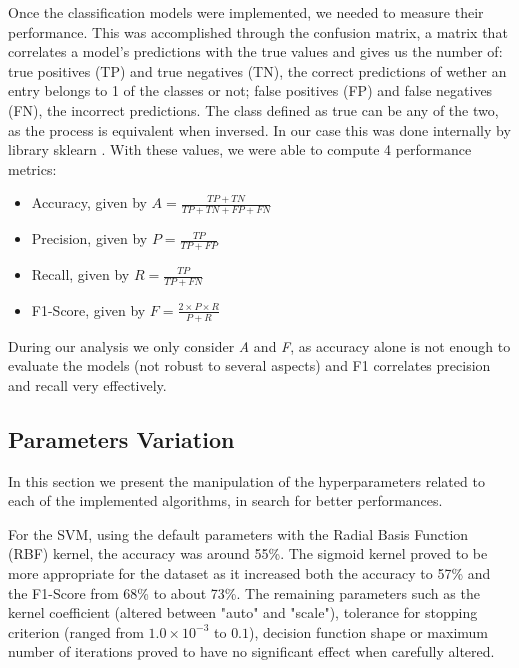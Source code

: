 \documentclass[extendedabs]{recpad2k}
\begin{document}
Once the classification models were implemented, we needed to measure their performance.
This was accomplished through the confusion matrix, a matrix that correlates a model's predictions with the true values and gives us the number of: 
true positives (TP) and true negatives (TN), the correct predictions of wether an entry belongs to 1 of the classes or not; false positives (FP) and 
false negatives (FN), the incorrect predictions.
The class defined as true can be any of the two, as the process is equivalent when inversed.
In our case this was done internally by library sklearn \cite{sklearn}.
With these values, we were able to compute 4 performance metrics:
\begin{itemize}[noitemsep,nolistsep]
\item Accuracy, given by $A = \frac{TP + TN}{TP + TN + FP + FN}$
\vspace{3pt}
\item Precision, given by $P = \frac{TP}{TP + FP}$
\vspace{3pt}
\item Recall, given by $R = \frac{TP}{TP + FN}$
\vspace{3pt}
\item F1-Score, given by $F = \frac{2 \times P \times R}{P + R}$
\vspace{3pt}
\end{itemize}
During our analysis we only consider \textit{A} and \textit{F}, as accuracy alone is not enough to evaluate the models (not robust to several aspects) and F1 
correlates precision and recall very effectively.

\subsection{Parameters Variation}

In this section we present the manipulation of the hyperparameters related to each of the implemented algorithms, in search for better performances.

For the SVM, using the default parameters with the Radial Basis Function (RBF) kernel, the accuracy was around 55\%.
The sigmoid kernel proved to be more appropriate for the dataset as it increased both the accuracy to 57\% and the F1-Score from 68\% to about 73\%.
The remaining parameters such as the kernel coefficient (altered between "auto" and "scale"), tolerance for stopping criterion (ranged from $1.0 \times 10^{-3}$
to $0.1$), decision function shape or maximum number of iterations proved to have no significant effect when carefully altered.
\end{document}
